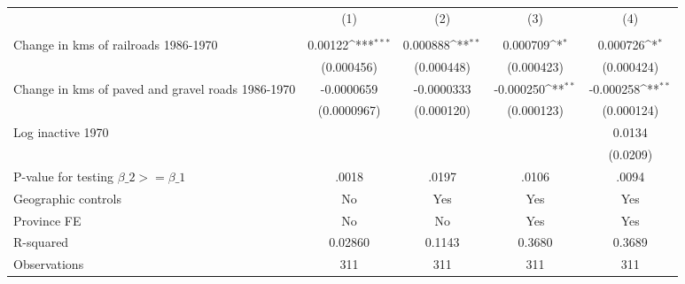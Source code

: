 {
\def\sym#1{\ifmmode^{#1}\else\(^{#1}\)\fi}
\begin{tabular}{l*{4}{c}}
\hline\hline
                &\multicolumn{1}{c}{(1)}&\multicolumn{1}{c}{(2)}&\multicolumn{1}{c}{(3)}&\multicolumn{1}{c}{(4)}\\
                &\multicolumn{1}{c}{}&\multicolumn{1}{c}{}&\multicolumn{1}{c}{}&\multicolumn{1}{c}{}\\
\hline
Change in kms of railroads 1986-1970&  0.00122\sym{***}& 0.000888\sym{**} & 0.000709\sym{*}  & 0.000726\sym{*}  \\
                &(0.000456)         &(0.000448)         &(0.000423)         &(0.000424)         \\
[1em]
Change in kms of paved and gravel roads 1986-1970&-0.0000659         &-0.0000333         &-0.000250\sym{**} &-0.000258\sym{**} \\
                &(0.0000967)         &(0.000120)         &(0.000123)         &(0.000124)         \\
[1em]
Log inactive 1970&                  &                  &                  &   0.0134         \\
                &                  &                  &                  & (0.0209)         \\
\hline
P-value for testing $\beta\_{2} >= \beta\_{1}$&    .0018         &    .0197         &    .0106         &    .0094         \\
Geographic controls&       No         &      Yes         &      Yes         &      Yes         \\
Province FE     &       No         &       No         &      Yes         &      Yes         \\
R-squared       &  0.02860         &   0.1143         &   0.3680         &   0.3689         \\
Observations    &      311         &      311         &      311         &      311         \\
\hline\hline
\end{tabular}
}

